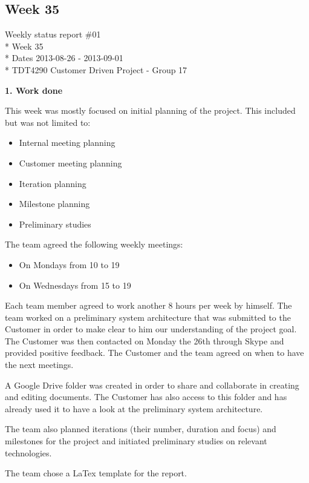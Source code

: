 \clearpage
\subsection{Week 35}

\begin{center}
Weekly status report \#01\\*
Week 35 \\*
Dates 2013-08-26 - 2013-09-01 \\*
TDT4290 Customer Driven Project - Group 17
\end{center}

\textbf{1. Work done}

This week was mostly focused on initial planning of the project.
This included but was not limited to:
\begin{itemize}
\item Internal meeting planning
\item Customer meeting planning
\item Iteration planning
\item Milestone planning
\item Preliminary studies
\end{itemize}


The team agreed the following weekly meetings:
\begin{itemize}
\item On Mondays from 10 to 19
\item On Wednesdays from 15 to 19
\end{itemize}

Each team member agreed to work another 8 hours per week by himself.
The team worked on a preliminary system architecture that was submitted
to the Customer in order to make clear to him our understanding of the project goal.
The Customer was then contacted on Monday the 26th through Skype and provided positive feedback.
The Customer and the team agreed on when to have the next meetings.

A Google Drive folder was created in order to share and collaborate in creating and editing documents. 
The Customer has also access to this folder and has already used it to have a look at the preliminary system architecture.

The team also planned iterations (their number, duration and focus) and milestones for the project
and initiated preliminary studies on relevant technologies.

The team chose a LaTex template for the report.

